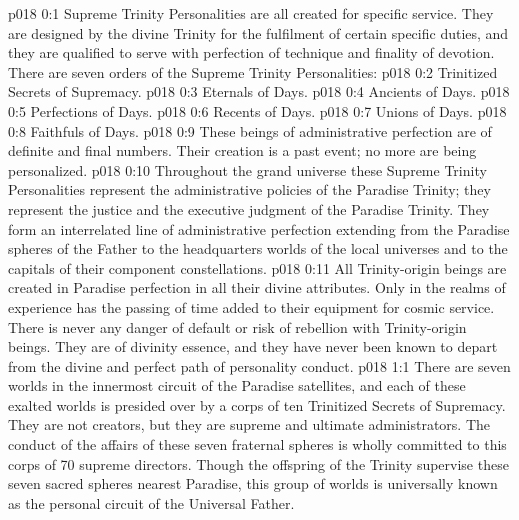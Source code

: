 \author{Divine Counsellor}
\vs p018 0:1 Supreme Trinity Personalities are all created for specific service. They are designed by the divine Trinity for the fulfilment of certain specific duties, and they are qualified to serve with perfection of technique and finality of devotion. There are seven orders of the Supreme Trinity Personalities:
\vs p018 0:2 \bibnobreakspace Trinitized Secrets of Supremacy.
\vs p018 0:3 \bibnobreakspace Eternals of Days.
\vs p018 0:4 \bibnobreakspace Ancients of Days.
\vs p018 0:5 \bibnobreakspace Perfections of Days.
\vs p018 0:6 \bibnobreakspace Recents of Days.
\vs p018 0:7 \bibnobreakspace Unions of Days.
\vs p018 0:8 \bibnobreakspace Faithfuls of Days.
\vs p018 0:9 \pc These beings of administrative perfection are of definite and final numbers. Their creation is a past event; no more are being personalized.
\vs p018 0:10 Throughout the grand universe these Supreme Trinity Personalities represent the administrative policies of the Paradise Trinity; they represent the justice and  the executive judgment of the Paradise Trinity. They form an interrelated line of administrative perfection extending from the Paradise spheres of the Father to the headquarters worlds of the local universes and to the capitals of their component constellations.
\vs p018 0:11 All Trinity\hyp{}origin beings are created in Paradise perfection in all their divine attributes. Only in the realms of experience has the passing of time added to their equipment for cosmic service. There is never any danger of default or risk of rebellion with Trinity\hyp{}origin beings. They are of divinity essence, and they have never been known to depart from the divine and perfect path of personality conduct.
\vs p018 1:1 There are seven worlds in the innermost circuit of the Paradise satellites, and each of these exalted worlds is presided over by a corps of ten Trinitized Secrets of Supremacy. They are not creators, but they are supreme and ultimate administrators. The conduct of the affairs of these seven fraternal spheres is wholly committed to this corps of 70 supreme directors. Though the offspring of the Trinity supervise these seven sacred spheres nearest Paradise, this group of worlds is universally known as the personal circuit of the Universal Father.

